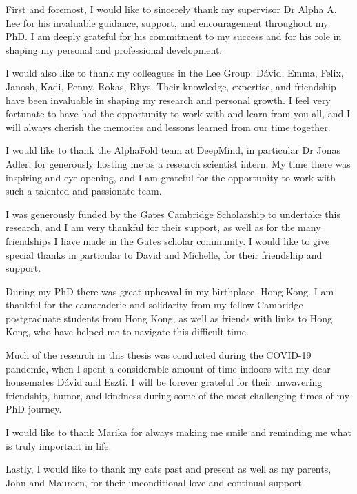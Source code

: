 
\begin{acknowledgements}

First and foremost, I would like to sincerely thank my supervisor Dr Alpha A. Lee for his invaluable guidance, support, and encouragement throughout my PhD. I am deeply grateful for his commitment to my success and for his role in shaping my personal and professional development.

I would also like to thank my colleagues in the Lee Group: Dávid, Emma, Felix, Janosh, Kadi, Penny, Rokas, Rhys. Their knowledge, expertise, and friendship have been invaluable in shaping my research and personal growth. I feel very fortunate to have had the opportunity to work with and learn from you all, and I will always cherish the memories and lessons learned from our time together.

I would like to thank the AlphaFold team at DeepMind, in particular Dr Jonas Adler, for generously hosting me as a research scientist intern. My time there was inspiring and eye-opening, and I am grateful for the opportunity to work with such a talented and passionate team.

I was generously funded by the Gates Cambridge Scholarship to undertake this research, and I am very thankful for their support, as well as for the many friendships I have made in the Gates scholar community. I would like to give special thanks in particular to David and Michelle, for their friendship and support.

During my PhD there was great upheaval in my birthplace, Hong Kong. I am thankful for the camaraderie and solidarity from my fellow Cambridge postgraduate students from Hong Kong, as well as friends with links to Hong Kong, who have helped me to navigate this difficult time.

Much of the research in this thesis was conducted during the COVID-19 pandemic, when I spent a considerable amount of time indoors with my dear housemates Dávid and Eszti. I will be forever grateful for their unwavering friendship, humor, and kindness during some of the most challenging times of my PhD journey.

I would like to thank Marika for always making me smile and reminding me what is truly important in life.

Lastly, I would like to thank my cats past and present as well as my parents, John and Maureen, for their unconditional love and continual support.

\end{acknowledgements}
